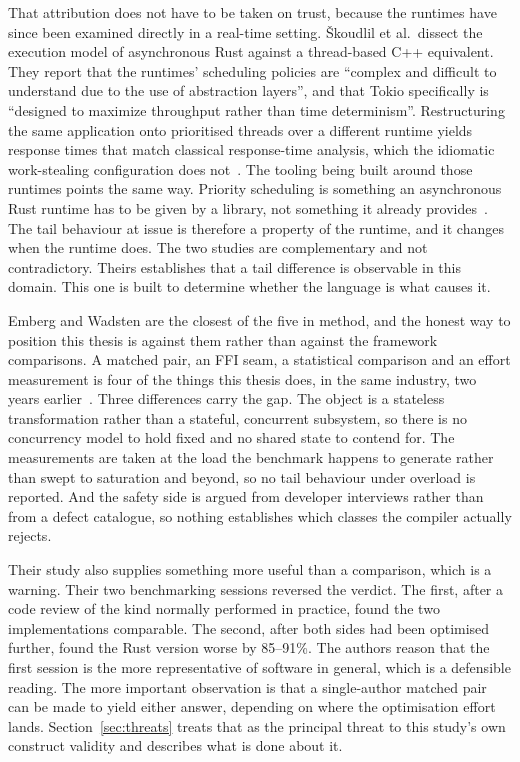 \documentclass[english,oneside,a4paper,censored,csm,software-track-2020]{HYthesisML}
\begin{document}
That attribution does not have to be taken on trust, because the runtimes have since been
examined directly in a real-time setting. \v{S}koudlil et al.\ dissect the execution model of
asynchronous Rust against a thread-based C++ equivalent. They report that the
runtimes' scheduling policies are ``complex and difficult to understand due to the use of
abstraction layers'', and that Tokio specifically is ``designed to maximize throughput rather than
time determinism''. Restructuring the same application onto prioritised threads over a different
runtime yields response times that match classical response-time analysis, which the idiomatic
work-stealing configuration does not~\cite{skoudlil2025asyncrust}. The tooling being built around
those runtimes points the same way. Priority scheduling is something an asynchronous Rust runtime
has to be given by a library, not something it already
provides~\cite{zhuang2026flowprioritize}. The tail behaviour at issue is
therefore a property of the runtime, and it changes when the runtime does. The two studies are
complementary and not contradictory. Theirs establishes that a tail difference is observable in
this domain. This one is built to determine whether the language is what causes it.

Emberg and Wadsten are the closest of the five in method, and the honest way to position this
thesis is against them rather than against the framework comparisons. A matched pair, an FFI seam,
a statistical comparison and an effort measurement is four of the things this thesis does, in the
same industry, two years earlier~\cite{emberg2023asn1}. Three differences carry the gap. The
object is a stateless transformation rather than a stateful, concurrent subsystem, so there is no
concurrency model to hold fixed and no shared state to contend for. The measurements are taken at
the load the benchmark happens to generate rather than swept to saturation and beyond, so no tail
behaviour under overload is reported. And the safety side is argued from developer interviews
rather than from a defect catalogue, so nothing establishes which classes the compiler actually
rejects.

Their study also supplies something more useful than a comparison, which is a warning.
Their two benchmarking sessions reversed the verdict. The first, after a code review of the kind
normally performed in practice, found the two implementations comparable. The second, after both
sides had been optimised further, found the Rust version worse by 85--91\%. The authors reason
that the first session is the more representative of software in general, which is a defensible
reading. The more important observation is that a single-author matched pair can be made to
yield either answer, depending on where the optimisation effort lands.
Section~\ref{sec:threats} treats that as the principal threat to this study's own construct
validity and describes what is done about it.
\end{document}
